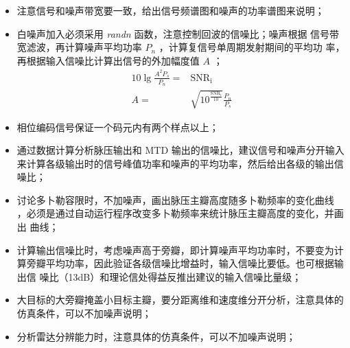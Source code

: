 \documentclass[../main]{subfiles}
\begin{document}
\begin{itemize}
  \item 注意信号和噪声带宽要一致，给出信号频谱图和噪声的功率谱图来说明；
  \item 白噪声加入必须采用 \emph{randn} 函数，注意控制回波的信噪比；噪声根据
    信号带宽滤波，再计算噪声平均功率 $P_n$ ，计算复信号单周期发射期间的平均功
    率，再根据输入信噪比计算出信号的外加幅度值 $A$ ；
    \begin{align}
      10\lg \frac{A^2P_s}{P_n} = & \mathrm{SNR}_\mathrm{i}\\
      A = & \sqrt{10^{\frac{\mathrm{SNR}_\mathrm{i}}{10}}}\frac{P_n}{P_s}
    \end{align}
  \item 相位编码信号保证一个码元内有两个样点以上；
  \item 通过数据计算分析脉压输出和 MTD 输出的信噪比，建议信号和噪声分开输入
    来计算各级输出时的信号峰值功率和噪声的平均功率，然后给出各级的输出信噪比；
  \item 讨论多卜勒容限时，不加噪声，画出脉压主瓣高度随多卜勒频率的变化曲线
    ，必须是通过自动运行程序改变多卜勒频率来统计脉压主瓣高度的变化，并画出
    曲线；
  \item  计算输出信噪比时，考虑噪声高于旁瓣，即计算噪声平均功率时，不要变为计
    算旁瓣平均功率，因此验证各级信噪比增益时，输入信噪比要低。也可根据输出信
    噪比（13dB）和理论信处得益反推出建议的输入信噪比量级；
  \item 大目标的大旁瓣掩盖小目标主瓣，要分距离维和速度维分开分析，注意具体的
    仿真条件，可以不加噪声说明；
  \item 分析雷达分辨能力时，注意具体的仿真条件，可以不加噪声说明；
\end{itemize}
\end{document}
